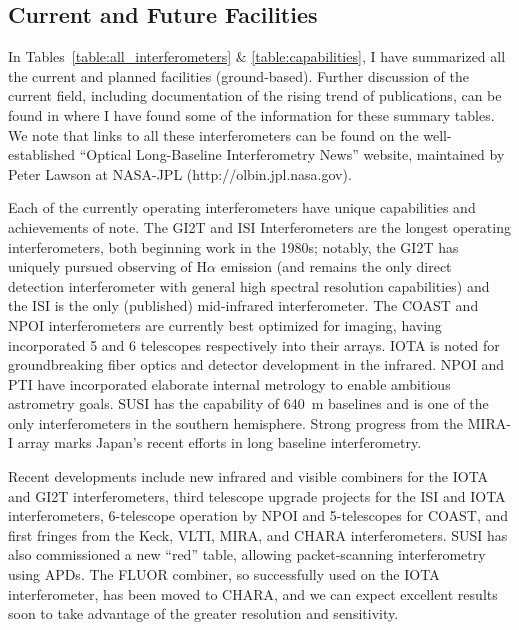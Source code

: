 \documentclass[12pt]{article}
\begin{document}
\subsection{Current and Future Facilities}

\label{projects}
In Tables~\ref{table:all_interferometers} \& \ref{table:capabilities},
I have summarized all the current and planned facilities
(ground-based).  Further discussion of the current field, including
documentation of the rising trend of publications, can be found in
\citet{ridgway2000} where I have found some of the information for
these summary tables.  We note that links to all these interferometers
can be found on the well-established ``Optical Long-Baseline
Interferometry News'' website, maintained by Peter Lawson at NASA-JPL
(http://olbin.jpl.nasa.gov). 

Each of the currently operating interferometers have unique
capabilities and achievements of note.  The GI2T and ISI
Interferometers are the longest operating interferometers, both
beginning work in the 1980s; notably, the GI2T has uniquely pursued
observing of H$\alpha$ emission (and remains the only direct detection
interferometer with general high spectral resolution capabilities) and
the ISI is the only (published) mid-infrared interferometer. The COAST
and NPOI interferometers are currently best optimized for imaging,
having incorporated 5 and 6 telescopes respectively into their arrays.
IOTA is noted for groundbreaking fiber optics and detector development
in the infrared.  NPOI and PTI have incorporated elaborate internal
metrology to enable ambitious astrometry goals. SUSI has the
capability of 640~m baselines and is one of the only interferometers
in the southern hemisphere.  Strong progress from the MIRA-I array
marks Japan's recent efforts in long baseline interferometry.

Recent developments include new infrared and visible combiners
for the IOTA \citep[first integrated optics success with
stars][]{berger2001} and GI2T interferometers, third telescope upgrade
projects for the ISI and IOTA interferometers, 6-telescope operation
by NPOI and 5-telescopes for COAST, and first fringes from the Keck,
VLTI, MIRA, and CHARA interferometers. SUSI has also commissioned a
new ``red'' table, allowing packet-scanning interferometry using APDs.
The FLUOR combiner, so successfully used on the IOTA interferometer,
has been moved to CHARA, and we can expect excellent results soon to
take advantage of the greater resolution and sensitivity.
\end{document}
